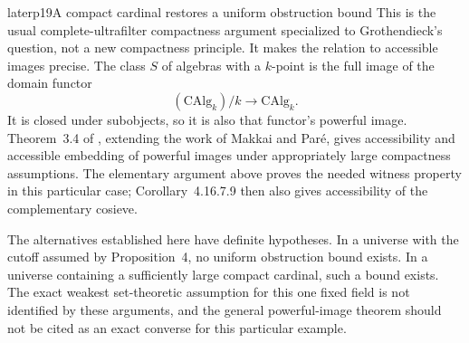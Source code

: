 \begin{dcomment}{later}{p19}{A compact cardinal restores a uniform obstruction bound}
This is the usual complete-ultrafilter compactness argument specialized to Grothendieck's question, not a new compactness principle. It makes the relation to accessible images precise. The class $S$ of algebras with a $k$-point is the full image of the domain functor
\[
 (\mathrm{CAlg}_k)/k\longrightarrow\mathrm{CAlg}_k.
\]
It is closed under subobjects, so it is also that functor's powerful image. Theorem~3.4 of \citet{BrookeTaylorRosicky2017}, extending the work of Makkai and Par\'e, gives accessibility and accessible embedding of powerful images under appropriately large compactness assumptions. The elementary argument above proves the needed witness property in this particular case; Corollary~4.16.7.9 then also gives accessibility of the complementary cosieve.

The alternatives established here have definite hypotheses. In a universe with the cutoff assumed by Proposition~4, no uniform obstruction bound exists. In a universe containing a sufficiently large compact cardinal, such a bound exists. The exact weakest set-theoretic assumption for this one fixed field is not identified by these arguments, and the general powerful-image theorem should not be cited as an exact converse for this particular example.
\end{dcomment}
